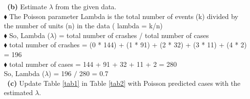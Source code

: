 \documentclass[a4 paper]{article}
\numberwithin{equation}{section}
\newcommand{\subproblem}[1]{~\newline\textbf{(#1)}}
\newcommand{\0}{\mathbf{0}}
\begin{document}
\subproblem{b} Estimate $\lambda$ from the given data. \\
{\color{olive} $\blacklozenge$ The Poisson parameter Lambda is the total number of events (k) divided by the number of units (n) in the data ( lambda = k/n)} \\
{\color{olive} $\blacklozenge$ So, Lambda ($\lambda$) = total number of crashes / total number of cases} \\
{\color{violet} $\blacklozenge$ total number of crashes = (0 * 144) + (1 * 91) + (2 * 32) + (3 * 11) + (4 * 2) = 196}\\
{\color{violet} $\blacklozenge$ total number of cases = 144 + 91 + 32 + 11 + 2 = 280}\\
{\color{teal} So, Lambda ($\lambda$) = 196 $/$ 280 = 0.7 } \\
\subproblem{c} Update Table \ref{tab1} in Table \ref{tab2} with Poisson predicted cases with the estimated $\lambda$.\\
\end{document}
